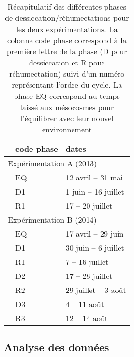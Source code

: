\begin{table}
\centering
\caption{Récapitulatif des différentes phases de dessiccation/réhumectations pour les deux expérimentations. La colonne code phase correspond à la première lettre de la phase (D pour dessiccation et R pour réhumectation) suivi d'un numéro représentant l'ordre du cycle. La phase EQ correspond au temps laissé aux mésocosmes pour l'équilibrer avec leur nouvel environnement }
\label{table:recap_DR}
\begin{tabular}{lll}\toprule
 & code phase & dates \\ \midrule
\multicolumn{3}{l}{Expérimentation A (2013)} \\
 & EQ & 12 avril -- 31 mai \\ [+.5ex]
 & D1 & 1 juin -- 16 juillet  \\
 & R1 & 17 -- 20 juillet\\ [+1ex]
\multicolumn{3}{l}{Expérimentation B (2014)} \\
 & EQ & 17 avril -- 29 juin \\ [+.5ex]
 & D1 & 30 juin -- 6 juillet \\
 & R1 & 7 -- 16 juillet\\ [+.5ex]
 & D2 & 17 -- 28 juillet\\
 & R2 & 29 juillet -- 3 août\\[+.5ex]
 & D3 & 4 -- 11 août\\
 & R3 & 12 -- 14 août\\
\bottomrule
\end{tabular}
\end{table}


\subsection{Analyse des données}


